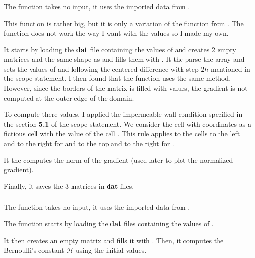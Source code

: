 \subsubsection{\textcolor{func}{}}
The function \textcolor{func}{} takes no input, it uses the imported data
from .

This function is rather big, but it is only a variation of the 
function from . The function  does not work
the way I want with the  values so I made my own.

It starts by loading the \textbf{dat} file containing the values of 
and creates 2 empty matrices  and  the same shape as
 and fills them with . It the parse the 
array and sets the values of  and  following the centered
difference with step $2h$ mentioned in the scope statement. I then found that
the function  uses the same method. However, since the
borders of the matrix  is filled with  values, the
gradient is not computed at the outer edge of the domain.

To compute there values, I applied the impermeable wall condition specified in
the section \textbf{5.1} of the scope statement. We consider the 
 cell with coordinates \py{[i - 1, j]} as a fictious cell with
the value of the cell \py{[i, j]}. This rule applies to the cells to the left
and to the right for  and to the top and to the right for
.

It the computes the norm of the gradient (used later to plot the normalized
gradient).

Finally, it saves the 3 matrices in \textbf{dat} files.

\subsubsection{\textcolor{func}{}}
The function  takes no input, it uses the imported data
from .

The function starts by loading the \textbf{dat} files containing the values of
.

It then creates an empty matrix  and fills it with .
Then, it computes the Bernoulli's constant $\mathcal{H}$ using the initial
values.

